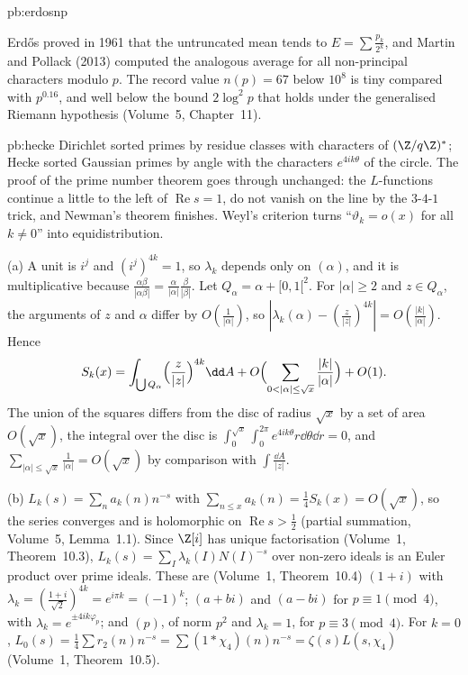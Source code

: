 \begin{solution}{pb:erdosnp}

\leads Erd\H os proved in 1961 that the untruncated mean tends to $E=\sum\frac{p_k}{2^k}$, and Martin and Pollack (2013) computed the analogous average for all non-principal characters
modulo $p$. The record value $n(p)=67$ below $10^8$ is tiny compared with $p^{0.16}$, and well below the bound $2\log^2p$ that holds under the generalised Riemann hypothesis
(Volume~5, Chapter~11).
\end{solution}

\begin{solution}{pb:hecke}
\idea Dirichlet sorted primes by residue classes with characters of $(\Z/q\Z)^*$; Hecke sorted Gaussian primes by angle with the characters $e^{4ik\theta}$ of the circle. The
proof of the prime number theorem goes through unchanged: the $L$-functions continue a little to the left of $\operatorname{Re}s=1$, do not vanish on the line by the $3$-$4$-$1$ trick,
and Newman's theorem finishes. Weyl's criterion turns ``$\vartheta_k=o(x)$ for all $k\ne0$'' into equidistribution.

\writeup (a) A unit is $i^j$ and $(i^j)^{4k}=1$, so $\lambda_k$ depends only on $(\alpha)$, and it is multiplicative because $\frac{\alpha\beta}{|\alpha\beta|}=\frac\alpha{|\alpha|}\frac\beta{|\beta|}$. Let $Q_\alpha=\alpha+[0,1[^2$.
For $|\alpha|\ge2$ and $z\in Q_\alpha$, the arguments of $z$ and $\alpha$ differ by $O(\frac1{|\alpha|})$, so $|\lambda_k(\alpha)-(\frac z{|z|})^{4k}|=O(\frac{|k|}{|\alpha|})$. Hence
\[
S_k(x)=\int_{\bigcup Q_\alpha}\Bigl(\frac z{|z|}\Bigr)^{4k}\dd A+O\Bigl(\sum_{0<|\alpha|\le\sqrt x}\frac{|k|}{|\alpha|}\Bigr)+O(1).
\]
The union of the squares differs from the disc of radius $\sqrt x$ by a set of area $O(\sqrt x)$, the integral over the disc is $\int_0^{\sqrt x}\int_0^{2\pi}e^{4ik\theta}r\dd\theta\dd r=0$,
and $\sum_{|\alpha|\le\sqrt x}\frac1{|\alpha|}=O(\sqrt x)$ by comparison with $\int\frac{\dd A}{|z|}$.

(b) $L_k(s)=\sum_na_k(n)n^{-s}$ with $\sum_{n\le x}a_k(n)=\frac14S_k(x)=O(\sqrt x)$, so the series converges and is holomorphic on $\operatorname{Re}s>\frac12$ (partial summation, Volume~5,
Lemma~1.1). Since $\Z[i]$ has unique factorisation (Volume~1, Theorem~10.3), $L_k(s)=\sum_I\lambda_k(I)N(I)^{-s}$ over non-zero ideals is an Euler product over prime ideals. These are
(Volume~1, Theorem~10.4) $(1+i)$ with $\lambda_k=(\frac{1+i}{\sqrt2})^{4k}=e^{i\pi k}=(-1)^k$; $(a+bi)$ and $(a-bi)$ for $p\equiv1\pmod4$, with $\lambda_k=e^{\pm4ik\varphi_p}$; and $(p)$, of norm
$p^2$ and $\lambda_k=1$, for $p\equiv3\pmod4$. For $k=0$, $L_0(s)=\frac14\sum r_2(n)n^{-s}=\sum(1*\chi_4)(n)n^{-s}=\zeta(s)L(s,\chi_4)$ (Volume~1, Theorem~10.5).


\end{solution}
